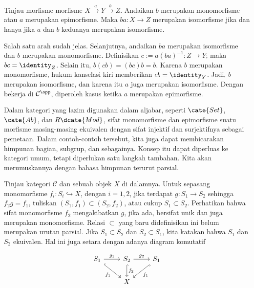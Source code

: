 \begin{proposisi}\label{prop:epi-mono-isomorphism}
	Tinjau morfisme-morfisme $X \xrightarrow{a} Y \xrightarrow{b} Z$. Andaikan
	$b$ merupakan monomorfisme atau $a$ merupakan epimorfisme. Maka
	$ba: X \to Z$ merupakan isomorfisme jika dan hanya jika $a$ dan $b$
	keduanya merupakan isomorfisme.
\end{proposisi}

\begin{bukti}
	Salah satu arah sudah jelas. Selanjutnya, andaikan $ba$ merupakan
	isomorfisme dan $b$ merupakan monomorfisme. Definisikan
	$c := a(ba)^{-1}: Z \to Y$; maka $bc = \identity_Z$. Selain itu,
	$b(cb) = (bc)b = b$. Karena $b$ merupakan monomorfisme, hukum kanselasi
	kiri memberikan $cb = \identity_Y$. Jadi, $b$ merupakan isomorfisme, dan
	karena itu $a$ juga merupakan isomorfisme. Dengan bekerja di
	$\mathcal{C}^{\opp}$, diperoleh kasus ketika $a$ merupakan epimorfisme.
\end{bukti}

Dalam kategori yang lazim digunakan dalam aljabar, seperti $\cate{Set}$,
$\cate{Ab}$, dan $R\dcate{Mod}$, sifat monomorfisme dan epimorfisme suatu
morfisme masing-masing ekuivalen dengan sifat injektif dan surjektifnya
sebagai pemetaan. Dalam contoh-contoh tersebut, kita juga dapat membicarakan
himpunan bagian, subgrup, dan sebagainya. Konsep itu dapat diperluas ke
kategori umum, tetapi diperlukan satu langkah tambahan. Kita akan
merumuskannya dengan bahasa himpunan terurut parsial.

Tinjau kategori $\mathcal{C}$ dan sebuah objek $X$ di dalamnya. Untuk sepasang
monomorfisme $f_i: S_i \hookrightarrow X$, dengan $i = 1, 2$, jika terdapat
$g: S_1 \to S_2$ sehingga $f_2 g = f_1$, tuliskan
$(S_1, f_1) \subset (S_2, f_2)$, atau cukup $S_1 \subset S_2$. Perhatikan
bahwa sifat monomorfisme $f_2$ mengakibatkan $g$, jika ada, bersifat unik dan
juga merupakan monomorfisme. Relasi $\subset$ yang baru didefinisikan ini
belum merupakan urutan parsial. Jika $S_1 \subset S_2$ dan
$S_2 \subset S_1$, kita katakan bahwa $S_1$ dan $S_2$ ekuivalen. Hal ini juga
setara dengan adanya diagram komutatif

\[\begin{tikzcd}
	S_1 \arrow[r, "g_1"] \arrow[hookrightarrow, rd, "f_1"'] & S_2 \arrow[hookrightarrow, d, "f_2"] \arrow[r, "g_2"] & S_1 \arrow[hookrightarrow, ld, "f_1"] \\
	& X &
\end{tikzcd}\]

